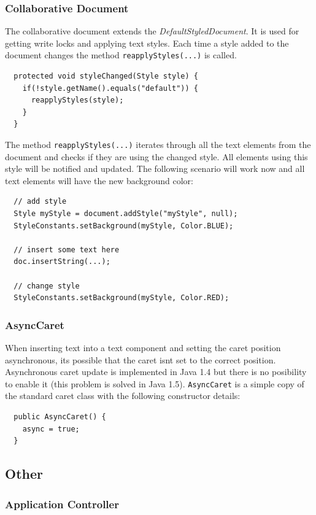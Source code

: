 \subsubsection{Collaborative Document}
\label{applicationlayer_collabdocument}
The collaborative document extends the \textit{DefaultStyledDocument}. It is used for getting write locks and applying text styles. Each time a style added to the document changes the method \texttt{reapplyStyles(...)} is called.
\begin{verbatim}
  protected void styleChanged(Style style) {
    if(!style.getName().equals("default")) {
      reapplyStyles(style);
    }
  }
\end{verbatim}

The method \texttt{reapplyStyles(...)} iterates through all the text elements from the document and checks if they are using the changed style. All elements using this style will be notified and updated. The following scenario will work now and all text elements will have the new background color:
\begin{verbatim}
  // add style
  Style myStyle = document.addStyle("myStyle", null);
  StyleConstants.setBackground(myStyle, Color.BLUE);
  
  // insert some text here
  doc.insertString(...);
  
  // change style
  StyleConstants.setBackground(myStyle, Color.RED);
\end{verbatim}

\subsubsection{AsyncCaret}
When inserting text into a text component and setting the caret position asynchronous, its possible that the caret isnt set to the correct position. Asynchronous caret update is implemented in Java 1.4 but there is no posibility to enable it (this problem is solved in Java 1.5). \texttt{AsyncCaret} is a simple copy of the standard caret class with the following constructor details:
\begin{verbatim}
  public AsyncCaret() {
    async = true;
  }
\end{verbatim}

\subsection{Other}
\subsubsection{Application Controller}
